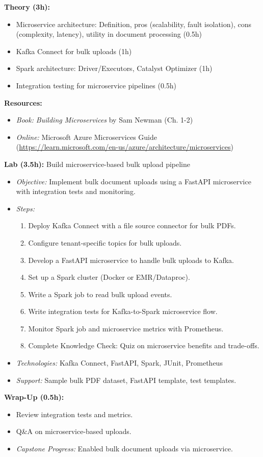 \documentclass[11pt]{article}
\begin{document}
\textbf{Theory (3h):}
\begin{itemize}
    \item Microservice architecture: Definition, pros (scalability, fault isolation), cons (complexity, latency), utility in document processing (0.5h)
    \item Kafka Connect for bulk uploads (1h)
    \item Spark architecture: Driver/Executors, Catalyst Optimizer (1h)
    \item Integration testing for microservice pipelines (0.5h)
\end{itemize}
\textbf{Resources:}
\begin{itemize}
    \item \textit{Book:} \textit{Building Microservices} by Sam Newman (Ch. 1-2)
    \item \textit{Online:} Microsoft Azure Microservices Guide (\url{https://learn.microsoft.com/en-us/azure/architecture/microservices})
\end{itemize}

\textbf{Lab (3.5h):} Build microservice-based bulk upload pipeline
\begin{itemize}
    \item \textit{Objective:} Implement bulk document uploads using a FastAPI microservice with integration tests and monitoring.
    \item \textit{Steps:}
        \begin{enumerate}
            \item Deploy Kafka Connect with a file source connector for bulk PDFs.
            \item Configure tenant-specific topics for bulk uploads.
            \item Develop a FastAPI microservice to handle bulk uploads to Kafka.
            \item Set up a Spark cluster (Docker or EMR/Dataproc).
            \item Write a Spark job to read bulk upload events.
            \item Write integration tests for Kafka-to-Spark microservice flow.
            \item Monitor Spark job and microservice metrics with Prometheus.
            \item Complete Knowledge Check: Quiz on microservice benefits and trade-offs.
        \end{enumerate}
    \item \textit{Technologies:} Kafka Connect, FastAPI, Spark, JUnit, Prometheus
    \item \textit{Support:} Sample bulk PDF dataset, FastAPI template, test templates.
\end{itemize}
\textbf{Wrap-Up (0.5h):}
\begin{itemize}
    \item Review integration tests and metrics.
    \item Q\&A on microservice-based uploads.
    \item \textit{Capstone Progress:} Enabled bulk document uploads via microservice.
\end{itemize}
\end{document}
